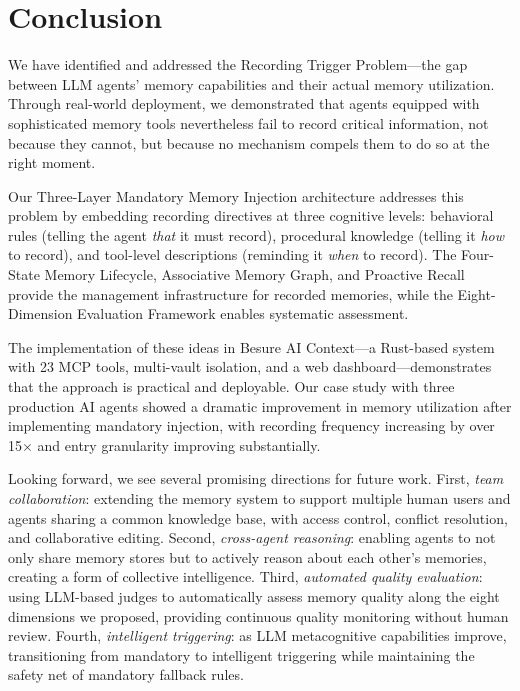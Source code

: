 \documentclass[11pt]{article}
\begin{document}
\section{Conclusion}

We have identified and addressed the Recording Trigger Problem---the gap between LLM agents' memory capabilities and their actual memory utilization. Through real-world deployment, we demonstrated that agents equipped with sophisticated memory tools nevertheless fail to record critical information, not because they cannot, but because no mechanism compels them to do so at the right moment.

Our Three-Layer Mandatory Memory Injection architecture addresses this problem by embedding recording directives at three cognitive levels: behavioral rules (telling the agent \emph{that} it must record), procedural knowledge (telling it \emph{how} to record), and tool-level descriptions (reminding it \emph{when} to record). The Four-State Memory Lifecycle, Associative Memory Graph, and Proactive Recall provide the management infrastructure for recorded memories, while the Eight-Dimension Evaluation Framework enables systematic assessment.

The implementation of these ideas in Besure AI Context---a Rust-based system with 23 MCP tools, multi-vault isolation, and a web dashboard---demonstrates that the approach is practical and deployable. Our case study with three production AI agents showed a dramatic improvement in memory utilization after implementing mandatory injection, with recording frequency increasing by over 15$\times$ and entry granularity improving substantially.

Looking forward, we see several promising directions for future work. First, \emph{team collaboration}: extending the memory system to support multiple human users and agents sharing a common knowledge base, with access control, conflict resolution, and collaborative editing. Second, \emph{cross-agent reasoning}: enabling agents to not only share memory stores but to actively reason about each other's memories, creating a form of collective intelligence. Third, \emph{automated quality evaluation}: using LLM-based judges to automatically assess memory quality along the eight dimensions we proposed, providing continuous quality monitoring without human review. Fourth, \emph{intelligent triggering}: as LLM metacognitive capabilities improve, transitioning from mandatory to intelligent triggering while maintaining the safety net of mandatory fallback rules.
\end{document}
